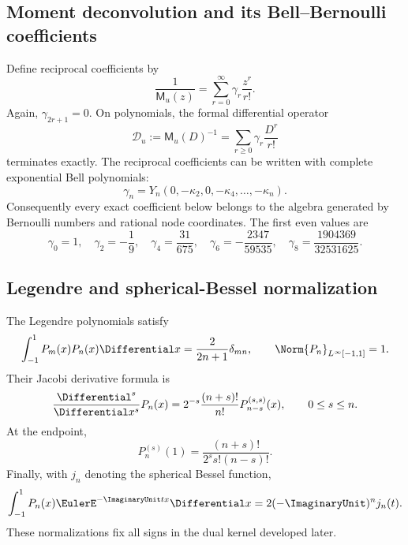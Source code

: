 \documentclass[11pt,oneside]{article}
\numberwithin{equation}{section}
\theoremstyle{definition}
\theoremstyle{remark}
\newcommand{\MM}{\mathsf M}
\newcommand{\Dscr}{\mathscr D_u}
\begin{document}
\subsection{Moment deconvolution and its Bell--Bernoulli coefficients}

Define reciprocal coefficients by
\begin{equation}
 \frac1{\MM_u(z)}=\sum_{r=0}^{\infty}\gamma_r\frac{z^r}{r!}.
 \label{eq:gamma-def}
\end{equation}
Again, $\gamma_{2r+1}=0$.  On polynomials, the formal differential operator
\begin{equation}
 \Dscr:=\MM_u(D)^{-1}
 =\sum_{r\ge0}\gamma_r\frac{D^r}{r!}
 \label{eq:deconvolution}
\end{equation}
terminates exactly.  The reciprocal coefficients can be written with complete
exponential Bell polynomials:
\begin{equation}
 \gamma_n=Y_n(0,-\kappa_2,0,-\kappa_4,\ldots,-\kappa_n).
 \label{eq:gamma-bell}
\end{equation}
Consequently every exact coefficient below belongs to the algebra generated by
Bernoulli numbers and rational node coordinates.  The first even values are
\begin{equation}
 \gamma_0=1,
 \quad \gamma_2=-\frac19,
 \quad \gamma_4=\frac{31}{675},
 \quad \gamma_6=-\frac{2347}{59535},
 \quad \gamma_8=\frac{1904369}{32531625}.
 \label{eq:gamma-first}
\end{equation}

\subsection{Legendre and spherical-Bessel normalization}

The Legendre polynomials satisfy
\begin{equation}
 \int_{-1}^{1}P_m(x)P_n(x)\Differential x=\frac{2}{2n+1}\delta_{mn},
 \qquad \Norm{P_n}_{L^\infty[-1,1]}=1.
 \label{eq:legendre-orthogonality}
\end{equation}
Their Jacobi derivative formula is
\begin{equation}
 \frac{\Differential^s}{\Differential x^s}P_n(x)
 =2^{-s}\frac{(n+s)!}{n!}P_{n-s}^{(s,s)}(x),
 \qquad 0\le s\le n.
 \label{eq:legendre-jacobi-derivative}
\end{equation}
At the endpoint,
\begin{equation}
 P_n^{(s)}(1)=\frac{(n+s)!}{2^ss!(n-s)!}.
 \label{eq:legendre-endpoint-derivative}
\end{equation}
Finally, with $j_n$ denoting the spherical Bessel function,
\begin{equation}
 \int_{-1}^{1}P_n(x)\EulerE^{-\ImaginaryUnit tx}\Differential x=2(-\ImaginaryUnit)^n j_n(t).
 \label{eq:legendre-bessel}
\end{equation}
These normalizations fix all signs in the dual kernel developed later.
\end{document}
